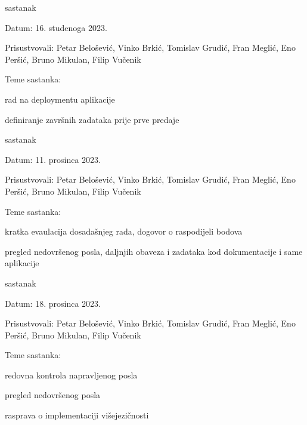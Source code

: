\begin{packed_enum}
			\item  sastanak
			\item[] \begin{packed_item}
				\item Datum: 16. studenoga 2023.
				\item Prisustvovali: Petar Belošević, Vinko Brkić, Tomislav Grudić, Fran Meglić, Eno Peršić, Bruno Mikulan, Filip Vučenik
				\item Teme sastanka:
				\begin{packed_item}
					\item rad na deploymentu aplikacije
					\item definiranje završnih zadataka prije prve predaje
				\end{packed_item}
			\end{packed_item}
			
			\item  sastanak
			\item[] \begin{packed_item}
				\item Datum: 11. prosinca 2023.
				\item Prisustvovali: Petar Belošević, Vinko Brkić, Tomislav Grudić, Fran Meglić, Eno Peršić, Bruno Mikulan, Filip Vučenik
				\item Teme sastanka:
				\begin{packed_item}
					\item kratka evaulacija dosadašnjeg rada, dogovor o raspodijeli bodova
					\item pregled nedovršenog posla, daljnjih obaveza i zadataka kod dokumentacije i same aplikacije
				\end{packed_item}
			\end{packed_item}
			
			\item  sastanak
			\item[] \begin{packed_item}
				\item Datum: 18. prosinca 2023.
				\item Prisustvovali: Petar Belošević, Vinko Brkić, Tomislav Grudić, Fran Meglić, Eno Peršić, Bruno Mikulan, Filip Vučenik
				\item Teme sastanka:
				\begin{packed_item}
					\item redovna kontrola napravljenog posla
					\item pregled nedovršenog posla
					\item rasprava o implementaciji višejezičnosti
				\end{packed_item}
			\end{packed_item}
			
		\end{packed_enum}
		
